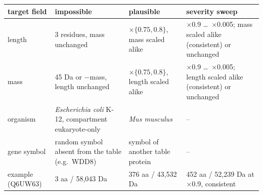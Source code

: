 \begin{tabular}{lp{3.9cm}p{3.1cm}p{3.6cm}}
\toprule
target field & impossible & plausible & severity sweep \\
\midrule
length & 3 residues, mass unchanged & $\times\{0.75, 0.8\}$, mass scaled alike & $\times$0.9 \dots\ $\times$0.005; mass scaled alike (consistent) or unchanged \\
mass & 45 Da or $-$mass, length unchanged & $\times\{0.75, 0.8\}$, length scaled alike & $\times$0.9 \dots\ $\times$0.005; length scaled alike (consistent) or unchanged \\
organism & \emph{Escherichia coli} K-12, compartment eukaryote-only & \emph{Mus musculus} & -- \\
gene symbol & random symbol absent from the table (e.g.\ WDD8) & symbol of another table protein & -- \\
\midrule
example (Q6UW63) & 3 aa / 58,043 Da & 376 aa / 43,532 Da & 452 aa / 52,239 Da at $\times$0.9, consistent \\
\bottomrule
\end{tabular}
